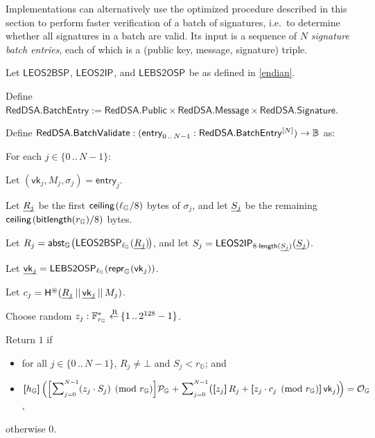 \documentclass{article}
\newcommand{\crossref}[1]{\autoref{#1}}
\newcommand{\tab}{\hspace{1.5em}}
\newcommand{\typecolon}{:}
\newcommand{\bytes}[1]{\underline{\raisebox{-0.3ex}{}\smash{#1}}}
\newcommand{\bit}{\mathbb{B}}
\newcommand{\Fieldstar}[1]{\mathbb{F}^\ast_{#1}}
\newcommand{\typeexp}[2]{{#1}\vphantom{)}^{[{#2}]}}
\newcommand{\bconcat}{\mathop{\kern 0.05em||}}
\newcommand{\length}{\mathsf{length}}
\newcommand{\bitlength}{\mathsf{bitlength}}
\newcommand{\setof}[1]{\{{#1}\}}
\newcommand{\barerange}[2]{{{#1}\,..\,{#2}}}
\newcommand{\range}[2]{\setof{\barerange{#1}{#2}}}
\newcommand{\ceiling}[1]{\mathsf{ceiling}\kern-0.06em\left({#1}\right)}
\newcommand{\sop}[3]{\!\scalebox{0.89}{$\scalebox{1.404}{$\strut#3$}_{#1}^{#2}$}}
\newcommand{\ssum}[2]{\sop{#1}{#2}{\sum}}
\newcommand{\mult}{\cdot}
\newcommand{\scalarmult}[2]{\boldsymbol{[}{#1}\boldsymbol{]}\,{#2}}
\newcommand{\Bigscalarmult}[2]{\Big[{#1}\Big]{#2}}
\newcommand{\clasp}[3][0pt]{\stackengine{0pt}{#3}{\kern#1#2}{O}{c}{F}{F}{L}}
\newcommand{\leftarrowR}{\mathop{\clasp[0.15em]{\raisebox{1.15ex}{\scriptsize R}}{$\,\leftarrow\,$}}}
\newcommand{\Entry}[1]{\mathsf{entry}_{#1}}
\newcommand{\vk}{\mathsf{vk}}
\newcommand{\vkBytes}[1]{\bytes{\vk_{#1}}}
\newcommand{\RedDSA}{\mathsf{RedDSA}}
\newcommand{\RedDSAPublic}{\RedDSA\mathsf{.Public}}
\newcommand{\RedDSAMessage}{\RedDSA\mathsf{.Message}}
\newcommand{\RedDSASignature}{\RedDSA\mathsf{.Signature}}
\newcommand{\RedDSABatchValidate}{\RedDSA\mathsf{.BatchValidate}}
\newcommand{\RedDSABatchEntry}{\RedDSA\mathsf{.BatchEntry}}
\newcommand{\RedDSASigR}[1]{R_{#1}}
\newcommand{\RedDSASigS}[1]{S_{#1}}
\newcommand{\RedDSAReprR}[1]{\bytes{\RedDSASigR{#1}}}
\newcommand{\RedDSAReprS}[1]{\bytes{\RedDSASigS{#1}}}
\newcommand{\RedDSASigc}[1]{c_{#1}}
\newcommand{\RedDSAHash}{\mathsf{H}}
\newcommand{\RedDSAHashToScalar}{\RedDSAHash^{\circledast}}
\newcommand{\Zero}{\mathcal{O}}
\newcommand{\Generator}{\mathcal{P}}
\newcommand{\ParamG}[1]{{{#1}_\mathbb{G}}}
\newcommand{\GroupG}[1]{\mathbb{G}_{#1}}
\newcommand{\ZeroG}[1]{\Zero_{\GroupG{#1}}}
\newcommand{\GenG}[1]{\Generator_{\GroupG{#1}}}
\newcommand{\ellG}[1]{\ell_{\GroupG{#1}}}
\newcommand{\reprG}[1]{\repr_{\GroupG{#1}}}
\newcommand{\abstG}[1]{\abst_{\GroupG{#1}}}
\newcommand{\repr}{\mathsf{repr}}
\newcommand{\abst}{\mathsf{abst}}
\newcommand{\LEOStoIP}[1]{\mathsf{LEOS2IP}_{#1}}
\newcommand{\LEBStoOSP}[1]{\mathsf{LEBS2OSP}_{#1}}
\newcommand{\LEOStoBSP}[1]{\mathsf{LEOS2BSP}_{#1}}
\begin{document}
Implementations can alternatively use the optimized procedure described in this section to perform
faster verification of a batch of signatures, i.e.\ to determine whether all signatures in a batch are valid.
Its input is a sequence of $N$ \emph{signature batch entries}, each of which is a
(public key, message, signature) triple.

Let $\LEOStoBSP{}$, $\LEOStoIP{}$, and $\LEBStoOSP{}$ be as defined in \crossref{endian}.

Define $\RedDSABatchEntry := \RedDSAPublic \times \RedDSAMessage \times \RedDSASignature$.

Define $\RedDSABatchValidate \typecolon (\Entry{\barerange{0}{N-1}} \typecolon \typeexp{\RedDSABatchEntry}{N})
                                        \rightarrow \bit$ as:
\begin{algorithm}
  \item For each $j \in \range{0}{N-1}$:
  \item \tab Let $(\vk_j, M_j, \sigma_j) = \Entry{j}$.
  \item \tab Let $\RedDSAReprR{j}$ be the first $\ceiling{\ellG{}/8}$ bytes of $\sigma_j$, and
             let $\RedDSAReprS{j}$ be the remaining $\ceiling{\bitlength(\ParamG{r})/8}$ bytes.
  \item \tab Let $\RedDSASigR{j} = \abstG{}\big(\LEOStoBSP{\ellG{}}(\RedDSAReprR{j})\kern-0.12em\big)$, and
             let $\RedDSASigS{j} = \LEOStoIP{8 \mult \length(\RedDSAReprS{j})}(\RedDSAReprS{j})$.
  \item \tab Let $\vkBytes{j} = \LEBStoOSP{\ellG{}}(\reprG{}(\vk_j))$.
  \item \tab Let $\RedDSASigc{j} = \RedDSAHashToScalar(\RedDSAReprR{j} \bconcat \vkBytes{j} \bconcat M_j)$.
        \vspace{1ex}
  \item \tab Choose random $z_j \typecolon \Fieldstar{\ParamG{r}} \leftarrowR \range{1}{2^{128}-1}$.
  \item \vspace{-2ex}
  \item Return $1$ if
        \vspace{1ex}
        \begin{itemize}
          \item for all $j \in \range{0}{N-1}$, $\RedDSASigR{j} \neq \bot$ and $\RedDSASigS{j} < \ParamG{r}$; and
          \item $\scalarmult{\ParamG{h}}{\Big(\Bigscalarmult{\ssum{j=0}{N-1}{(z_j \mult \RedDSASigS{j})
                                                                             \pmod{\ParamG{r}}}}{\GenG{}} +
                                              \ssum{j=0}{N-1}{\big(\scalarmult{z_j}{\RedDSASigR{j}} +
                                                                   \scalarmult{z_j \mult \RedDSASigc{j}
                                                                               \pmod{\ParamG{r}}}{\vk_j}\big)}\!\Big)}
                = \ZeroG{}$,
        \end{itemize}
        \vspace{-1ex}
        otherwise $0$.
\end{algorithm}
\end{document}

